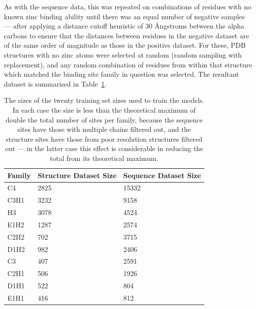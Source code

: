 As with the sequence data, this was repeated on combinations of residues with no known zinc binding ability until there was an equal number of negative samples --- after applying a distance cutoff heuristic of 30 {\AA}ngstroms between the alpha carbons to ensure that the distances between residues in the negative dataset are of the same order of magnitude as those in the positive dataset. For these, PDB structures with no zinc atoms were selected at random (random sampling with replacement), and any random combination of residues from within that structure which matched the binding site family in question was selected. The resultant dataset is summarised in Table~\ref{tab:dataset-size}.

\begin{table}
  \caption[Training set size.]{\label{tab:dataset-size}The sizes of the twenty training set sizes used to train the models. In each case the size is less than the theoretical maximum of double the total number of sites per family, because the sequence sites have those with multiple chains filtered out, and the structure sites have those from poor resolution structures filtered out --- in the latter case this effect is considerable in reducing the total from its theoretical maximum.}
\begin{center}
\begin{tabular}{lll} \hline
Family & Structure Dataset Size & Sequence Dataset Size \\ \hline
C4     & 2825         &  15332  \\
C3H1   & 3232         &  9158   \\
H3     & 3078         &  4524   \\
E1H2   & 1287         &  2574   \\
C2H2   &  702         &  3715   \\
D1H2   &  982         &  2406   \\
C3     &  407         &  2591   \\
C2H1   &  506         &  1926   \\
D1H1   &  522         &  804    \\ 
E1H1   &  416         &  812    \\ \hline
\end{tabular}
\end{center}
\end{table}

